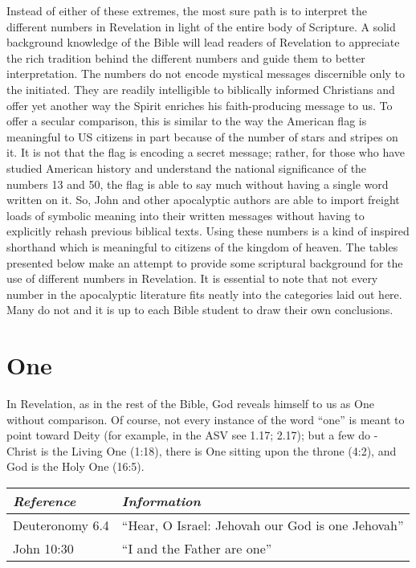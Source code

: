 Instead of either of these extremes, the most sure path is to interpret the different numbers in Revelation in light of the entire body of Scripture. A solid background knowledge of the Bible will lead readers of Revelation to appreciate the rich tradition behind the different numbers and guide them to better interpretation. The numbers do not encode mystical messages discernible only to the initiated. They are readily intelligible to biblically informed Christians and offer yet another way the Spirit enriches his faith-producing message to us. 
\newline\newline
To offer a secular comparison, this is similar to the way the American flag is meaningful to US citizens in part because of the number of stars and stripes on it. It is not that the flag is encoding a secret message; rather, for those who have studied American history and understand the national significance of the numbers 13 and 50, the flag is able to say much without having a single word written on it. So, John and other apocalyptic authors are able to import freight loads of symbolic meaning into their written messages without having to explicitly rehash previous biblical texts. Using these numbers is a kind of inspired shorthand which is meaningful to citizens of the kingdom of heaven.
\newline\newline
The tables presented below make an attempt to provide some scriptural background for the use of different numbers in Revelation. It is essential to note that not every number in the apocalyptic literature fits neatly into the categories laid out here. Many do not and it is up to each Bible student to draw their own conclusions.

\section*{One}

In Revelation, as in the rest of the Bible, God reveals himself to us as One without comparison. Of course, not every instance of the word ``one'' is meant to point toward Deity (for example, in the ASV see 1.17; 2.17); but a few do - Christ is the Living One (1:18), there is One sitting upon the throne (4:2), and God is the Holy One (16:5).
\newline\newline
{}
\begin{tabularx}{\textwidth}{l X}
\toprule
\rowcolor{headergray}\emph{Reference} & \emph{Information}\\ 
\midrule
Deuteronomy 6.4 & ``Hear, O Israel: Jehovah our God is one Jehovah'' \\
\addlinespace
John 10:30 & ``I and the Father are one'' \\
\bottomrule
\end{tabularx}
	

